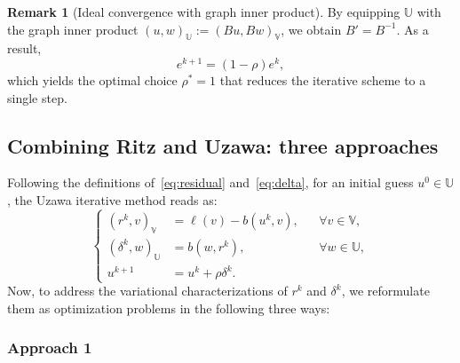 \documentclass{article}
\theoremstyle{definition}
\newtheorem{remark}{Remark}
\begin{document}
\begin{remark}[Ideal convergence with graph inner product]\label{section:particular_optimal}
By equipping $\mathbb{U}$ with the graph inner product $(u,w)_\mathbb{U}:=(Bu,Bw)_\mathbb{V}$, we obtain $B'=B^{-1}$.
As a result,
\begin{equation}\label{Uzawa_iterative}
e^{k+1} = (1-\rho) e^{k},
\end{equation} 
which yields the optimal choice $\rho^*=1$ that reduces the iterative scheme to a single step.
\end{remark}

\subsection{Combining Ritz and Uzawa: three approaches}

Following the definitions of~\eqref{eq:residual} and~\eqref{eq:delta}, for an initial guess $u^{0} \in \mathbb{U}$, the Uzawa iterative method reads as:
\begin{equation}
    \left\{
    \begin{aligned}
        (r^{k},v)_{\mathbb{V}} &= \ell(v)  - b(u^k,v), &&\forall v\in\mathbb{V},\\
        (\delta^{k},w)_{\mathbb{U}} &= b(w,r^{k}), &&\forall w\in\mathbb{U},\\
        u^{k+1} &= u^k + \rho \delta^k.
    \end{aligned}
    \right.
\label{eq:Uzawa_continuous0}
\end{equation}
Now, to address the variational characterizations of $r^k$ and $\delta^k$, we reformulate them as optimization problems in the following three ways:
\subsubsection{Approach 1}\label{subsection:main_approach1}
\end{document}
